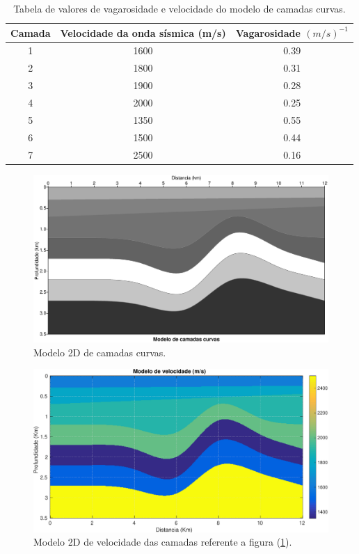 \begin{table}[H]
\centering
\begin{tabular}{|c|c|c|}
\hline
Camada & Velocidade da onda sísmica (m/s) & Vagarosidade $(m/s)^{-1}$ \\ \hline
1 & 1600 & 0.39 \\ \hline
2 & 1800 & 0.31 \\ \hline
3 & 1900 & 0.28 \\ \hline
4 & 2000 & 0.25 \\ \hline
5 & 1350 & 0.55 \\ \hline
6 & 1500 & 0.44 \\ \hline
7 & 2500 & 0.16 \\ \hline
\end{tabular}
\caption{Tabela de valores de vagarosidade e velocidade do modelo de camadas curvas.}
\label{tab:tab1}
\end{table}

\begin{landscape}
\begin{figure}[H]
\centering
\includegraphics[totalheight=14cm]{figuras/cap2/vagarosidade.eps}
\caption{Modelo 2D de camadas curvas.}
\label{fig:vagarosidade}
\end{figure}
\end{landscape}

\begin{landscape}
\begin{figure}[H]
\centering
\includegraphics[totalheight=14cm]{figuras/cap2/modelo_de_velocidade.eps}
\caption{Modelo 2D de velocidade das camadas referente a figura (\ref{fig:vagarosidade}).}
\label{fig:modelo_velocidade}
\end{figure}
\end{landscape}

